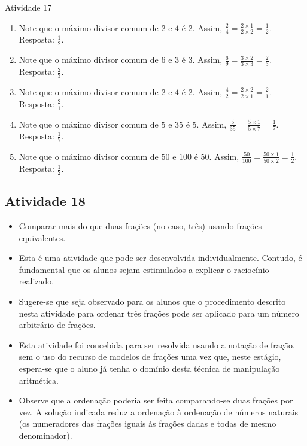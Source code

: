 \begin{multicols}{2}
\begin{resposta*}{Atividade 17}
\begin{enumerate}
 \item Note que o máximo divisor comum de   $2$   e   $4$   é 2. Assim,   
$\frac{2}{4} = \frac{2 \times 1}{2 \times 2} = \frac{1}{2}$. Resposta:   
$\frac{1}{2}$.  
 \item Note que o máximo divisor comum de   $6$   e   $3$   é 3. Assim,   
$\frac{6}{9} = \frac{3 \times 2}{3 \times 3} = \frac{2}{3}$. Resposta:   
$\frac{2}{3}$.  
 \item Note que o máximo divisor comum de   $2$   e   $4$   é 2. Assim,   
$\frac{4}{2} = \frac{2 \times 2}{2 \times 1} = \frac{2}{1}$. Resposta:   
$\frac{2}{1}$.  
 \item Note que o máximo divisor comum de   $5$   e   $35$   é 5. Assim,   
$\frac{5}{35} = \frac{5 \times 1}{5 \times 7} = \frac{1}{7}$. Resposta:   
$\frac{1}{7}$.  
 \item Note que o máximo divisor comum de   $50$   e   $100$   é 50. Assim,   
$\frac{50}{100} = \frac{50 \times 1}{50 \times 2} = \frac{1}{2}$. Resposta:   
$\frac{1}{2}$.  
\end{enumerate}

\end{resposta*}



\subsection{Atividade 18}
  
\begin{itemize} %
    \item       Comparar mais do que duas frações (no caso, três) usando frações 
equivalentes.
\end{itemize} %
  
  
 
\begin{itemize} %
    \item       Esta é uma atividade que pode ser desenvolvida individualmente. 
Contudo, é fundamental que os alunos sejam estimulados a explicar o raciocínio 
realizado.
    \item       Sugere-se que seja observado para os alunos que o procedimento 
descrito nesta atividade para ordenar três frações pode ser aplicado para um 
número arbitrário de frações.
    \item       Esta atividade foi concebida para ser resolvida usando a notação 
de fração, sem o uso do recurso de modelos de frações uma vez que, neste 
estágio, espera-se que o aluno já tenha o domínio desta técnica de manipulação 
aritmética.
    \item       Observe que a ordenação poderia ser feita comparando-se duas 
frações por vez. A solução indicada reduz a ordenação à ordenação de números 
naturais (os numeradores das frações iguais às frações dadas e todas de mesmo 
denominador).
\end{itemize} %
  

\end{multicols}
